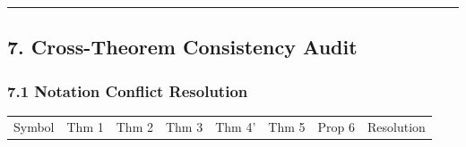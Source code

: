 \documentclass[
  12pt,
]{ctexart}
\begin{document}
\begin{center}\rule{0.5\linewidth}{0.5pt}\end{center}

\subsection{7. Cross-Theorem Consistency
Audit}\label{cross-theorem-consistency-audit}

\subsubsection{7.1 Notation Conflict
Resolution}\label{notation-conflict-resolution}

\begin{longtable}[]{@{}
  >{\raggedright\arraybackslash}p{}
  >{\raggedright\arraybackslash}p{}
  >{\raggedright\arraybackslash}p{}
  >{\raggedright\arraybackslash}p{}
  >{\raggedright\arraybackslash}p{}
  >{\raggedright\arraybackslash}p{}
  >{\raggedright\arraybackslash}p{}
  >{\raggedright\arraybackslash}p{}@{}}
\toprule\noalign{}
\begin{minipage}[b]{\linewidth}\raggedright
Symbol
\end{minipage} & \begin{minipage}[b]{\linewidth}\raggedright
Thm 1
\end{minipage} & \begin{minipage}[b]{\linewidth}\raggedright
Thm 2
\end{minipage} & \begin{minipage}[b]{\linewidth}\raggedright
Thm 3
\end{minipage} & \begin{minipage}[b]{\linewidth}\raggedright
Thm 4'
\end{minipage} & \begin{minipage}[b]{\linewidth}\raggedright
Thm 5
\end{minipage} & \begin{minipage}[b]{\linewidth}\raggedright
Prop 6
\end{minipage} & \begin{minipage}[b]{\linewidth}\raggedright
Resolution
\end{minipage} \\

\end{longtable}
\end{document}
